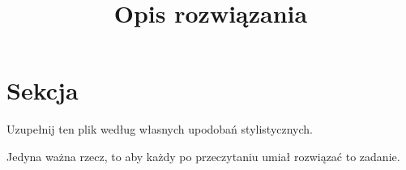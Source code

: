 \documentclass[12pt]{article}
\title{Opis rozwiązania}
\date{} %
\begin{document}
\maketitle

\section{Sekcja}
    Uzupełnij ten plik według własnych upodobań stylistycznych.

    Jedyna ważna rzecz, to aby każdy po przeczytaniu umiał rozwiązać to zadanie.
\end{document}
